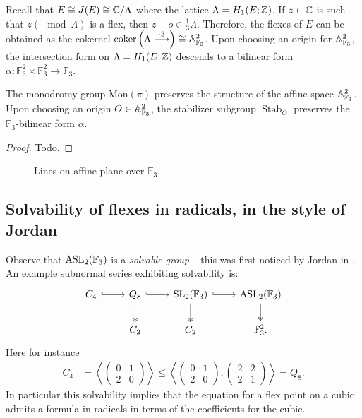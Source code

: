 \documentclass[11pt]{amsart}
\providecommand{\ASL}{\mathrm{ASL}}
\providecommand{\Mon}{\mathrm{Mon}}
\begin{document}
Recall that $E\cong J(E) \cong \mathbb{C}/ \Lambda$ where the lattice $\Lambda = H_1(E; \mathbb{Z})$. If $z\in \mathbb{C}$ is such that $z (\mod \Lambda)$ is a flex, then $z-o \in \frac{1}{3}\Lambda$. Therefore, the flexes of $E$ can be obtained as the cokernel $\operatorname{coker}\left(\Lambda \overset{\cdot 3}{\longrightarrow}\right) \cong \mathbb{A}^2_{\mathbb{F}_3}$.
Upon choosing an origin for $\mathbb{A}^2_{\mathbb{F}_3}$, the intersection form on $\Lambda = H_1(E; \mathbb{Z})$ descends to a bilinear form $\alpha: \mathbb{F}_3^2 \times \mathbb{F}_3^2 \to \mathbb{F}_3$. 

\begin{proposition}
    The monodromy group $\Mon(\pi)$ preserves the structure of the affine space $\mathbb{A}^2_{\mathbb{F}_3}$. Upon choosing an origin $O \in \mathbb{A}^2_{\mathbb{F}_3}$, the stabilizer subgroup $\operatorname{Stab}_O$ preserves the $\mathbb{F}_3$-bilinear form $\alpha$. 
\end{proposition}

\begin{proof}
    Todo.
\end{proof}

\begin{figure}
    
    \caption{Lines on affine plane over $\mathbb{F}_3$.}
    \label{fig: A2 F3}
\end{figure}


\subsection{Solvability of flexes in radicals, in the style of Jordan}

Observe that $\ASL_2(\F_3)$ is a \textit{solvable group} -- this was first noticed by Jordan in \cite[III.III\S1]{Jordan}. An example subnormal series exhibiting solvability is:
\[ \begin{tikzcd}
    C_4\rar[hook] & Q_8\rar[hook]\dar[two heads] & \SL_2(\F_3)\dar[two heads]\rar[hook] & \ASL_2(\F_3)\dar[two heads]\\
     & C_2 & C_2 & \F_3^2.
\end{tikzcd} \]
Here for instance
\begin{align*}
    C_4 &= \left\langle \begin{pmatrix} 0 & 1 \\ 2 & 0 \end{pmatrix}  \right\rangle \le \left\langle \begin{pmatrix} 0 & 1 \\ 2 & 0 \end{pmatrix}, \begin{pmatrix} 2 & 2 \\ 2 & 1 \end{pmatrix}  \right\rangle = Q_8.
\end{align*}
In particular this solvability implies that the equation for a flex point on a cubic admits a formula in radicals in terms of the coefficients for the cubic.
\end{document}
